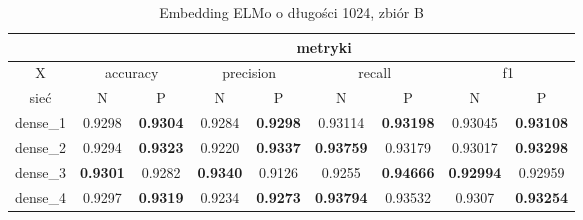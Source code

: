 \begin{table}[p] \centering
    \caption{Embedding ELMo o długości 1024, zbiór B}
    \label{tab:wyniki_elmo_B}
    \begin{tabular} {|c|c|c|c|c|c|c|c|c| }    \hline
                 & \multicolumn{8}{c|}{metryki}                                                                                                                                                                                                                                                            \\ \hline
        X        & \multicolumn{2}{c|}{accuracy}       & \multicolumn{2}{c|}{precision}      & \multicolumn{2}{c|}{recall} & \multicolumn{2}{c|}{f1}                                                                                                                                                       \\ \hline
        sieć     & N                                   & P                                   & N                           & P                                   & N                           & P                                    & N                                    & P                           \\ \hline
        dense\_1 & 0.9298                              & \textbf{0.9304}                     & 0.9284                      & \textbf{0.9298}                     & 0.93114                     & \textbf{0.93198}                     & 0.93045                              & \textbf{0.93108}            \\ \hline
        dense\_2 & 0.9294                              & \textbf{0.9323}                     & 0.9220                      & \textbf{0.9337}                     & \textbf{0.93759}            & 0.93179                              & 0.93017                              & \textbf{0.93298}            \\ \hline
        dense\_3 & \textbf{0.9301}                     & 0.9282                              & \textbf{0.9340}             & 0.9126                              & 0.9255                      & \textbf{0.94666}                     & \textbf{0.92994}                     & 0.92959                     \\ \hline
        dense\_4 & 0.9297                              & \textbf{0.9319}                     & 0.9234                      & \textbf{0.9273}                     & \textbf{0.93794}            & 0.93532                              & 0.9307                               & \textbf{0.93254}            \\ \hline

\end{tabular}
\end{table}
